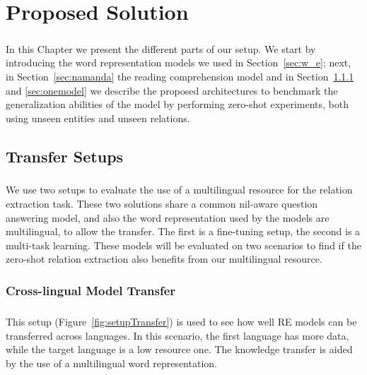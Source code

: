 \chapter{Proposed Solution}
\label{chpt:5}

\paragraph{}
In this Chapter we present the different parts of our setup. We start by introducing the word representation models we used in Section~\ref{sec:w_e}; next, in Section~\ref{sec:namanda} the reading comprehension model and in Section~\ref{sec:xlingual} and \ref{sec:onemodel} we describe the proposed architectures to benchmark the generalization abilities of the model by performing zero-shot experiments, both using unseen entities and unseen relations.


\section{Transfer Setups}
\paragraph{}
We use two setups to evaluate the use of a multilingual resource for the relation extraction task. These two solutions share a common nil-aware question answering model, and also the word representation used by the models are multilingual, to allow the transfer. The first is a fine-tuning setup, the second is a multi-task learning. These models will be evaluated on two scenarios to find if the zero-shot relation extraction also benefits from our multilingual resource.

\subsection{Cross-lingual Model Transfer}
\label{sec:xlingual}
\paragraph{}
This setup (Figure~\ref{fig:setupTransfer}) is used to see how well RE models can be transferred across languages. In this scenario, the first language has more data, while the target language is a low resource one. The knowledge transfer is aided by the use of a multilingual word representation.

